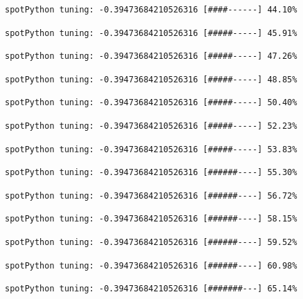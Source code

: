 \documentclass[
  letterpaper,
  DIV=11,
  numbers=noendperiod]{scrreprt}
\begin{document}
\begin{verbatim}
spotPython tuning: -0.39473684210526316 [####------] 44.10% 
\end{verbatim}

\begin{verbatim}
spotPython tuning: -0.39473684210526316 [#####-----] 45.91% 
\end{verbatim}

\begin{verbatim}
spotPython tuning: -0.39473684210526316 [#####-----] 47.26% 
\end{verbatim}

\begin{verbatim}
spotPython tuning: -0.39473684210526316 [#####-----] 48.85% 
\end{verbatim}

\begin{verbatim}
spotPython tuning: -0.39473684210526316 [#####-----] 50.40% 
\end{verbatim}

\begin{verbatim}
spotPython tuning: -0.39473684210526316 [#####-----] 52.23% 
\end{verbatim}

\begin{verbatim}
spotPython tuning: -0.39473684210526316 [#####-----] 53.83% 
\end{verbatim}

\begin{verbatim}
spotPython tuning: -0.39473684210526316 [######----] 55.30% 
\end{verbatim}

\begin{verbatim}
spotPython tuning: -0.39473684210526316 [######----] 56.72% 
\end{verbatim}

\begin{verbatim}
spotPython tuning: -0.39473684210526316 [######----] 58.15% 
\end{verbatim}

\begin{verbatim}
spotPython tuning: -0.39473684210526316 [######----] 59.52% 
\end{verbatim}

\begin{verbatim}
spotPython tuning: -0.39473684210526316 [######----] 60.98% 
\end{verbatim}

\begin{verbatim}
spotPython tuning: -0.39473684210526316 [#######---] 65.14% 
\end{verbatim}
\end{document}
